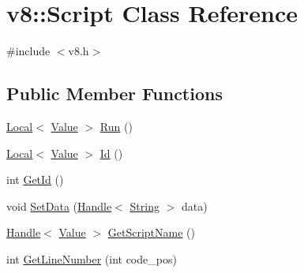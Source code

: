 \hypertarget{classv8_1_1_script}{}\section{v8\+:\+:Script Class Reference}
\label{classv8_1_1_script}


{\ttfamily \#include $<$v8.\+h$>$}

\subsection*{Public Member Functions}
\begin{DoxyCompactItemize}
\item 
\hyperlink{classv8_1_1_local}{Local}$<$ \hyperlink{classv8_1_1_value}{Value} $>$ \hyperlink{classv8_1_1_script_a5f43b29d40bd51ebad2cc275ba3898a1}{Run} ()
\item 
\hyperlink{classv8_1_1_local}{Local}$<$ \hyperlink{classv8_1_1_value}{Value} $>$ \hyperlink{classv8_1_1_script_aa25adfbb98af9179b4891e09432c2916}{Id} ()
\item 
int \hyperlink{classv8_1_1_script_aacb1cf3b66a6542b898042689221d3d5}{Get\+Id} ()
\item 
void \hyperlink{classv8_1_1_script_a048fa4168b809ca73cc435e341e41b0b}{Set\+Data} (\hyperlink{classv8_1_1_handle}{Handle}$<$ \hyperlink{classv8_1_1_string}{String} $>$ data)
\item 
\hyperlink{classv8_1_1_handle}{Handle}$<$ \hyperlink{classv8_1_1_value}{Value} $>$ \hyperlink{classv8_1_1_script_af8ce37d0733b79046e8ccb76baa5d0d9}{Get\+Script\+Name} ()
\item 
int \hyperlink{classv8_1_1_script_a5cb7ed6fe0046a5b66c8810ab4a09876}{Get\+Line\+Number} (int code\+\_\+pos)
\end{DoxyCompactItemize}

